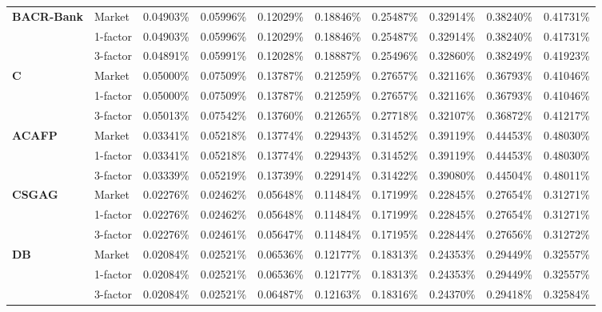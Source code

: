 \documentclass[12pt,a4paper]{article}
\theoremstyle{plain}
\numberwithin{equation}{section}
\begin{document}
{\begin{table}[t]
{\begin{tabular}{|rl|cccccccc|}
    \multicolumn{1}{|l}{\textbf{BACR-Bank}} & Market & 0.04903\% & 0.05996\% & 0.12029\% & 0.18846\% & 0.25487\% & 0.32914\% & 0.38240\% & 0.41731\% \\
\cline{3-10}          & 1-factor & 0.04903\% & 0.05996\% & 0.12029\% & 0.18846\% & 0.25487\% & 0.32914\% & 0.38240\% & 0.41731\% \\
          & 3-factor & 0.04891\% & 0.05991\% & 0.12028\% & 0.18887\% & 0.25496\% & 0.32860\% & 0.38249\% & 0.41923\% \\
    \hline
    \hline
    \multicolumn{1}{|l}{\textbf{C}} & Market & 0.05000\% & 0.07509\% & 0.13787\% & 0.21259\% & 0.27657\% & 0.32116\% & 0.36793\% & 0.41046\% \\
\cline{3-10}          & 1-factor & 0.05000\% & 0.07509\% & 0.13787\% & 0.21259\% & 0.27657\% & 0.32116\% & 0.36793\% & 0.41046\% \\
          & 3-factor & 0.05013\% & 0.07542\% & 0.13760\% & 0.21265\% & 0.27718\% & 0.32107\% & 0.36872\% & 0.41217\% \\
    \hline
    \hline
    \multicolumn{1}{|l}{\textbf{ACAFP}} & Market & 0.03341\% & 0.05218\% & 0.13774\% & 0.22943\% & 0.31452\% & 0.39119\% & 0.44453\% & 0.48030\% \\
\cline{3-10}          & 1-factor & 0.03341\% & 0.05218\% & 0.13774\% & 0.22943\% & 0.31452\% & 0.39119\% & 0.44453\% & 0.48030\% \\
          & 3-factor & 0.03339\% & 0.05219\% & 0.13739\% & 0.22914\% & 0.31422\% & 0.39080\% & 0.44504\% & 0.48011\% \\
    \hline
    \hline
    \multicolumn{1}{|l}{\textbf{CSGAG}} & Market & 0.02276\% & 0.02462\% & 0.05648\% & 0.11484\% & 0.17199\% & 0.22845\% & 0.27654\% & 0.31271\% \\
\cline{3-10}          & 1-factor & 0.02276\% & 0.02462\% & 0.05648\% & 0.11484\% & 0.17199\% & 0.22845\% & 0.27654\% & 0.31271\% \\
          & 3-factor & 0.02276\% & 0.02461\% & 0.05647\% & 0.11484\% & 0.17195\% & 0.22844\% & 0.27656\% & 0.31272\% \\
    \hline
    \hline
    \multicolumn{1}{|l}{\textbf{DB}} & Market & 0.02084\% & 0.02521\% & 0.06536\% & 0.12177\% & 0.18313\% & 0.24353\% & 0.29449\% & 0.32557\% \\
\cline{3-10}          & 1-factor & 0.02084\% & 0.02521\% & 0.06536\% & 0.12177\% & 0.18313\% & 0.24353\% & 0.29449\% & 0.32557\% \\
          & 3-factor & 0.02084\% & 0.02521\% & 0.06487\% & 0.12163\% & 0.18316\% & 0.24370\% & 0.29418\% & 0.32584\% \\

\end{tabular}}
\end{table}}
\end{document}
